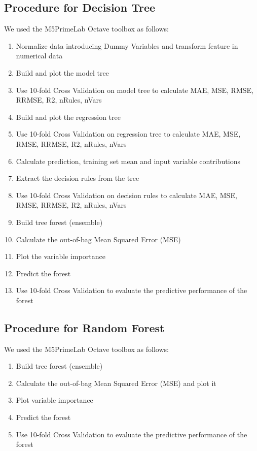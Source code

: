 \documentclass{article}
\begin{document}
\subsection{Procedure for Decision Tree}
We used the M5PrimeLab Octave toolbox as follows:
\begin{enumerate}  
	\item Normalize data introducing Dummy Variables and transform feature in numerical data
	\item Build and plot the model tree
	\item Use 10-fold Cross Validation on model tree to calculate MAE, MSE, RMSE, RRMSE, R2, nRules, nVars
	\item Build and plot the regression tree
	\item Use 10-fold Cross Validation on regression tree to calculate MAE, MSE, RMSE, RRMSE, R2, nRules, nVars
	\item Calculate prediction, training set mean and input variable contributions
	\item Extract the decision rules from the tree
	\item Use 10-fold Cross Validation on decision rules to calculate MAE, MSE, RMSE, RRMSE, R2, nRules, nVars
	\item Build tree forest (ensemble) 
	\item Calculate the out-of-bag Mean Squared Error (MSE) 
	\item Plot the variable importance
	\item Predict the forest
	\item Use 10-fold Cross Validation to evaluate the predictive performance of the forest
\end{enumerate}

\subsection{Procedure for Random Forest}
We used the M5PrimeLab Octave toolbox as follows:
\begin{enumerate}  
	\item Build tree forest (ensemble)
	\item Calculate the out-of-bag Mean Squared Error (MSE) and plot it
	\item Plot variable importance
	\item Predict the forest
	\item Use 10-fold Cross Validation to evaluate the predictive performance of the forest
\end{enumerate}
\end{document}
